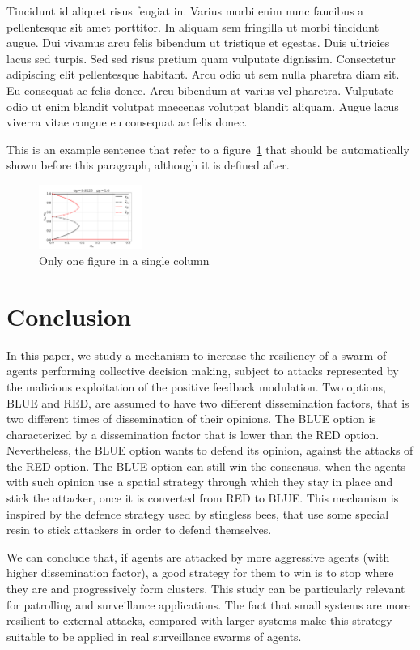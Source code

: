 \documentclass[journal]{IEEEtran}
\begin{document}
Tincidunt id aliquet risus feugiat in. Varius morbi enim nunc faucibus a pellentesque sit amet porttitor. In aliquam sem fringilla ut morbi tincidunt augue. Dui vivamus arcu felis bibendum ut tristique et egestas. Duis ultricies lacus sed turpis. Sed sed risus pretium quam vulputate dignissim. Consectetur adipiscing elit pellentesque habitant. Arcu odio ut sem nulla pharetra diam sit. Eu consequat ac felis donec. Arcu bibendum at varius vel pharetra. Vulputate odio ut enim blandit volutpat maecenas volutpat blandit aliquam. Augue lacus viverra vitae congue eu consequat ac felis donec. 

This is an example sentence that refer to a figure~\ref{fig:chart} that should be automatically shown before this paragraph, although it is defined after.

\begin{figure}
  \centering
  \includegraphics[width=0.3\textwidth]{images/chart.png}
  \hfill
\caption{Only one figure in a single column}
  \label{fig:chart}
\end{figure}


\section{Conclusion}
In this paper, we study a mechanism to increase the resiliency of a swarm of agents performing collective decision making, subject to attacks represented by the malicious exploitation of the positive feedback modulation. Two options, BLUE and RED, are assumed to have two different dissemination factors, that is two different times of dissemination of their opinions. The BLUE option is characterized by a dissemination factor that is lower than the RED option. Nevertheless, the BLUE option wants to defend its opinion, against the attacks of the RED option. The BLUE option can still win the consensus, when the agents with such opinion use a  spatial strategy through which they stay in place and stick the attacker, once it is converted from RED to BLUE. 
This mechanism is  inspired by the defence strategy used by stingless bees, that use some special resin to stick attackers in order to defend themselves. 

We can conclude that, if agents are attacked by more aggressive agents (with higher dissemination factor), a good strategy for them to win is to stop where they are and progressively form clusters. This study can be particularly relevant for patrolling and surveillance applications. The fact that small systems are more resilient to external attacks, compared with larger systems make this strategy suitable to be applied in real surveillance swarms of agents. 
\end{document}
